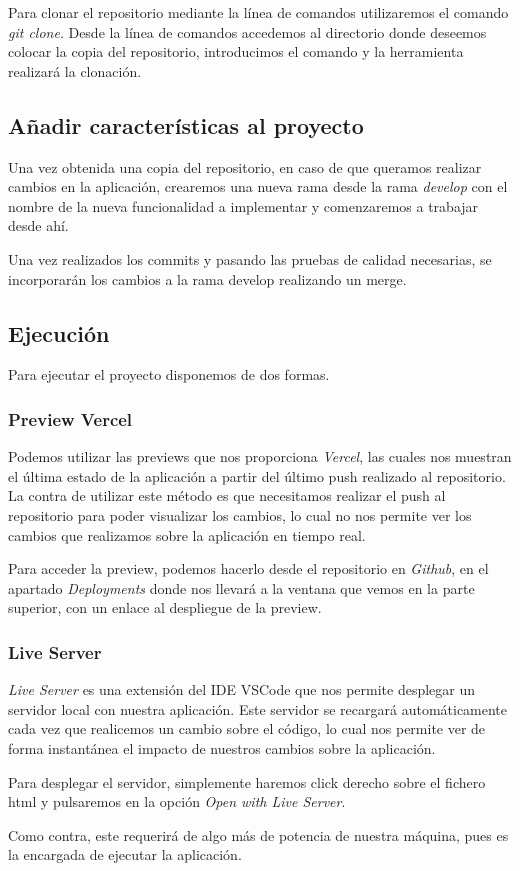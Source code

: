 Para clonar el repositorio mediante la línea de comandos utilizaremos el comando \emph{git clone}. Desde la línea de comandos accedemos al directorio donde deseemos colocar la copia del repositorio, introducimos el comando y la herramienta realizará la clonación.

\subsection{Añadir características al proyecto}
Una vez obtenida una copia del repositorio, en caso de que queramos realizar cambios en la aplicación, crearemos una nueva rama desde la rama \emph{develop} con el nombre de la nueva funcionalidad a implementar y comenzaremos a trabajar desde ahí.

Una vez realizados los commits y pasando las pruebas de calidad necesarias, se incorporarán los cambios a la rama develop realizando un merge.

\subsection{Ejecución}

Para ejecutar el proyecto disponemos de dos formas.

\subsubsection{Preview Vercel}

Podemos utilizar las previews que nos proporciona \emph{Vercel}, las cuales nos muestran el última estado de la aplicación a partir del último push realizado al repositorio. La contra de utilizar este método es que necesitamos realizar el push al repositorio para poder visualizar los cambios, lo cual no nos permite ver los cambios que realizamos sobre la aplicación en tiempo real.


Para acceder la preview, podemos hacerlo desde el repositorio en \emph{Github}, en el apartado \emph{Deployments} donde nos llevará a la ventana que vemos en la parte superior, con un enlace al despliegue de la preview.

\subsubsection{Live Server}


\emph{Live Server} es una extensión del IDE VSCode que nos permite desplegar un servidor local con nuestra aplicación. Este servidor se recargará automáticamente cada vez que realicemos un cambio sobre el código, lo cual nos permite ver de forma instantánea el impacto de nuestros cambios sobre la aplicación.

Para desplegar el servidor, simplemente haremos click derecho sobre el fichero html y pulsaremos en la opción \textit{Open with Live Server}.

Como contra, este requerirá de algo más de potencia de nuestra máquina, pues es la encargada de ejecutar la aplicación.